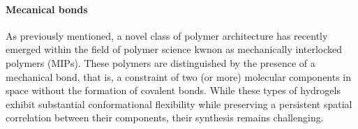 \paragraph{Mecanical bonds}
As previously mentioned, a novel class of polymer architecture has recently emerged within the field of polymer science kwnon as mechanically interlocked polymers (MIPs). 
These polymers are distinguished by the presence of a mechanical bond, that is, a constraint of two (or more) molecular components in space without the formation of covalent bonds\citep{hartMaterialPropertiesApplications2021}.
While these types of hydrogels exhibit substantial conformational flexibility while preserving a persistent spatial correlation between their components, their synthesis remains challenging.



